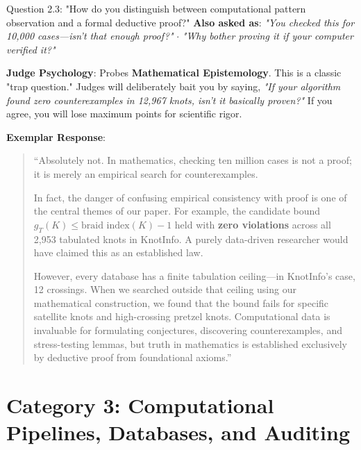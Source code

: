 \documentclass[11pt,letterpaper]{article}
\begin{document}
\vspace{1em}

\begin{questionbox}{Question 2.3: "How do you distinguish between computational pattern observation and a formal deductive proof?"}
\textbf{Also asked as}: \textit{"You checked this for 10,000 cases---isn't that enough proof?"} $\cdot$ \textit{"Why bother proving it if your computer verified it?"}
\end{questionbox}

\begin{strategybox}
\textbf{Judge Psychology}: Probes \textbf{Mathematical Epistemology}. This is a classic "trap question." Judges will deliberately bait you by saying, \textit{"If your algorithm found zero counterexamples in 12,967 knots, isn't it basically proven?"} If you agree, you will lose maximum points for scientific rigor.
\end{strategybox}

\begin{exemplarbox}
\textbf{Exemplar Response}:
\begin{quote}
``Absolutely not. In mathematics, checking ten million cases is not a proof; it is merely an empirical search for counterexamples. 

In fact, the danger of confusing empirical consistency with proof is one of the central themes of our paper. For example, the candidate bound $g_T(K) \leq \text{braid index}(K) - 1$ held with \textbf{zero violations} across all 2,953 tabulated knots in KnotInfo. A purely data-driven researcher would have claimed this as an established law.

However, every database has a finite tabulation ceiling---in KnotInfo's case, 12 crossings. When we searched outside that ceiling using our mathematical construction, we found that the bound fails for specific satellite knots and high-crossing pretzel knots. Computational data is invaluable for formulating conjectures, discovering counterexamples, and stress-testing lemmas, but truth in mathematics is established exclusively by deductive proof from foundational axioms.''
\end{quote}
\end{exemplarbox}

\newpage
\section{Category 3: Computational Pipelines, Databases, and Auditing}
\end{document}
